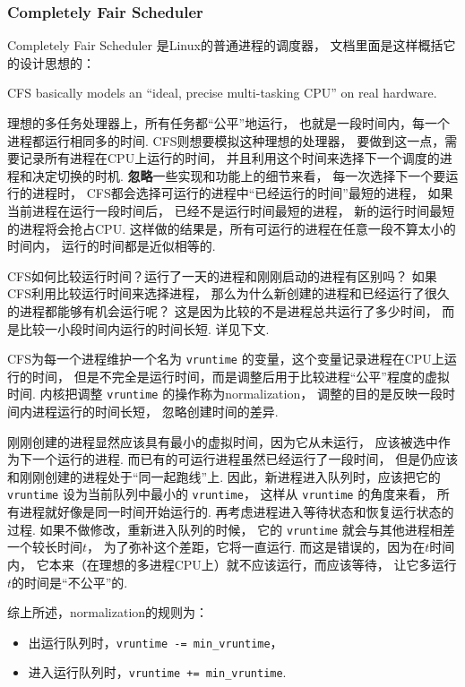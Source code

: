 \subsubsection{Completely Fair Scheduler}
Completely Fair Scheduler 是Linux的普通进程的调度器，
文档里面是这样概括它的设计思想的：\cite{CFSSched96:online}
\begin{displayquote}
	CFS basically models an “ideal, precise multi-tasking CPU” on real hardware.
\end{displayquote}
理想的多任务处理器上，所有任务都“公平”地运行，
也就是一段时间内，每一个进程都运行相同多的时间.
CFS则想要模拟这种理想的处理器，
要做到这一点，需要记录所有进程在CPU上运行的时间，
并且利用这个时间来选择下一个调度的进程和决定切换的时机.
\textbf{忽略}一些实现和功能上的细节来看，
每一次选择下一个要运行的进程时，
CFS都会选择可运行的进程中“已经运行的时间”最短的进程，
如果当前进程在运行一段时间后，
已经不是运行时间最短的进程，
新的运行时间最短的进程将会抢占CPU.
这样做的结果是，所有可运行的进程在任意一段不算太小的时间内，
运行的时间都是近似相等的.

\begin{qbox}{CFS如何比较运行时间？运行了一天的进程和刚刚启动的进程有区别吗？}
	如果CFS利用比较运行时间来选择进程，
	那么为什么新创建的进程和已经运行了很久的进程都能够有机会运行呢？
	这是因为比较的不是进程总共运行了多少时间，
	而是比较一小段时间内运行的时间长短.
	详见下文.
\end{qbox}

CFS为每一个进程维护一个名为 \lstinline{vruntime}
的变量，这个变量记录进程在CPU上运行的时间，
但是不完全是运行时间，而是调整后用于比较进程“公平”程度的虚拟时间.
内核把调整 \lstinline{vruntime} 的操作称为normalization，
调整的目的是反映一段时间内进程运行的时间长短，
忽略创建时间的差异.

刚刚创建的进程显然应该具有最小的虚拟时间，因为它从未运行，
应该被选中作为下一个运行的进程.
而已有的可运行进程虽然已经运行了一段时间，
但是仍应该和刚刚创建的进程处于“同一起跑线”上.
因此，新进程进入队列时，应该把它的 \lstinline{vruntime}
设为当前队列中最小的 \lstinline{vruntime}，
这样从 \lstinline{vruntime} 的角度来看，
所有进程就好像是同一时间开始运行的.
再考虑进程进入等待状态和恢复运行状态的过程.
如果不做修改，重新进入队列的时候，
它的 \lstinline{vruntime} 就会与其他进程相差一个较长时间$t$，
为了弥补这个差距，它将一直运行.
而这是错误的，因为在$t$时间内，
它本来（在理想的多进程CPU上）就不应该运行，而应该等待，
让它多运行$t$的时间是“不公平”的.

综上所述，normalization的规则为：
\begin{itemize}
	\item 出运行队列时，\lstinline{vruntime -= min_vruntime}，
	\item 进入运行队列时，\lstinline{vruntime += min_vruntime}.
\end{itemize}

